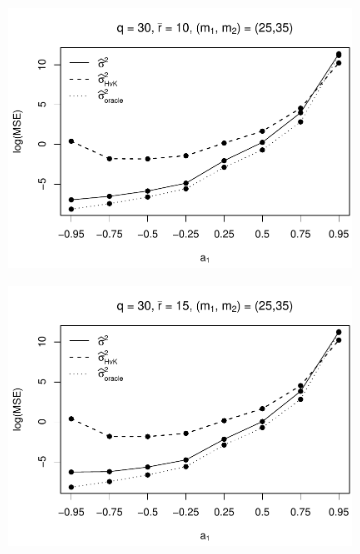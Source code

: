 \begin{figure}[p]
\begin{subfigure}[b]{0.45\textwidth}
\includegraphics[width=\textwidth]{Plots/Robustness/MSE_lrv_T=500_slope=10_(q,r,M1,M2)=(30,10,25,35).pdf}
\end{subfigure}
\hspace{0.25cm}
\begin{subfigure}[b]{0.45\textwidth}
\includegraphics[width=\textwidth]{Plots/Robustness/MSE_lrv_T=500_slope=10_(q,r,M1,M2)=(30,15,25,35).pdf}
\end{subfigure}


\end{figure}
